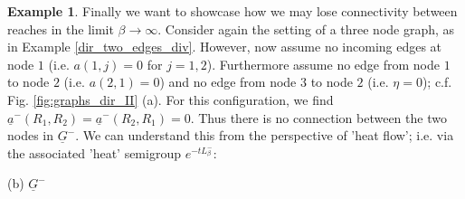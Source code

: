 \documentclass[reqno,12pt,letterpaper]{amsart}
\numberwithin{equation}{section}
\newcommand{\Lin}{L^{-}}
\newcommand{\1}{\mathds{1}}
\theoremstyle{definition}
\newtheorem{Ex}[Th]{Example}
\begin{document}
\noindent 		\begin{minipage}[b]{0.7\textwidth}
	\begin{Ex}\label{counter_intuitive_example} Finally we want to showcase how we may lose connectivity between 
	reaches in the limit $\beta \rightarrow \infty$. Consider again the setting of a three node graph, as in Example \ref{dir_two_edges_div}. However, now assume no incoming edges at node $1$ (i.e.  $a(1,j) = 0$ for $j=1,2$). Furthermore assume no edge from node $1$ to node $2$ (i.e. $a(2,1) = 0$) and no edge from node $3$ to node $2$ (i.e. $\eta = 0$); c.f. Fig. \ref{fig:graphs_dir_II} (a). For this configuration, we find $\underline{a}^-(R_1,R_2) = \underline{a}^-(R_2,R_1) = 0 $. Thus there is no connection between the two nodes in $\underline{G}^-$. We can understand this from the perspective of 'heat flow'; i.e. via the associated 'heat' semigroup $e^{-t \Lin_\beta}$:	
\end{Ex}
	\end{minipage}
	\begin{minipage}[b]{0.4\textwidth}
		\centering
		\begin{minipage}[b]{0.6\textwidth}
			\raggedleft
			\par\vspace{.5ex}
		\end{minipage}
		\hfill
		\begin{minipage}[b]{0.35\textwidth}
			\raggedright
			\par\vspace{0ex}
			(b) $\underline{G}^-$
		\end{minipage}
		\label{fig:graphs_dir_II}
	\end{minipage}	
\end{document}
